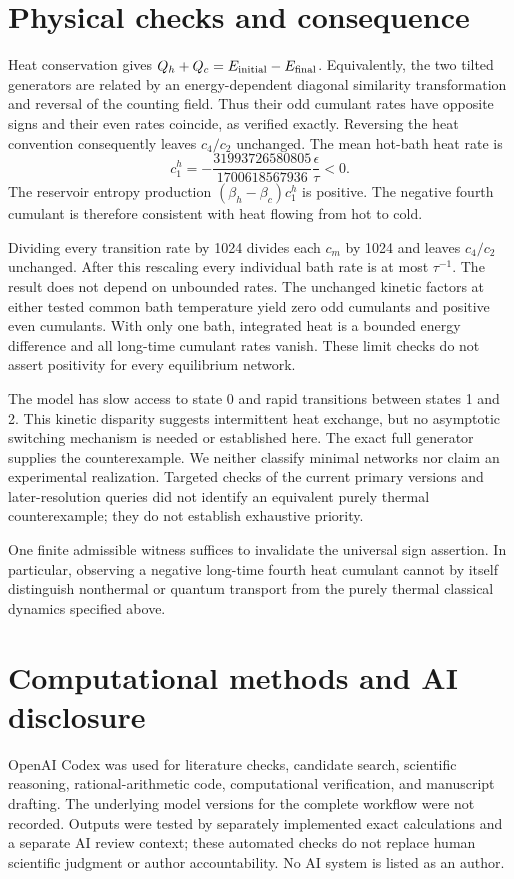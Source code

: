 \documentclass[aps,pre,10pt,onecolumn,notitlepage,longbibliography,amsmath,amssymb]{revtex4-2}
\begin{document}
\section{Physical checks and consequence}
Heat conservation gives $Q_h+Q_c=E_{\rm initial}-E_{\rm final}$. Equivalently, the two tilted generators are related by an energy-dependent diagonal similarity transformation and reversal of the counting field. Thus their odd cumulant rates have opposite signs and their even rates coincide, as verified exactly. Reversing the heat convention consequently leaves $c_4/c_2$ unchanged. The mean hot-bath heat rate is
\begin{equation}
 c_1^h=-\frac{31993726580805}{1700618567936}\frac{\epsilon}{\tau}<0.
\end{equation}
The reservoir entropy production $(\beta_h-\beta_c)c_1^h$ is positive. The negative fourth cumulant is therefore consistent with heat flowing from hot to cold.

Dividing every transition rate by 1024 divides each $c_m$ by 1024 and leaves $c_4/c_2$ unchanged. After this rescaling every individual bath rate is at most $\tau^{-1}$. The result does not depend on unbounded rates. The unchanged kinetic factors at either tested common bath temperature yield zero odd cumulants and positive even cumulants. With only one bath, integrated heat is a bounded energy difference and all long-time cumulant rates vanish. These limit checks do not assert positivity for every equilibrium network.

The model has slow access to state 0 and rapid transitions between states 1 and 2. This kinetic disparity suggests intermittent heat exchange, but no asymptotic switching mechanism is needed or established here. The exact full generator supplies the counterexample. We neither classify minimal networks nor claim an experimental realization. Targeted checks of the current primary versions and later-resolution queries did not identify an equivalent purely thermal counterexample; they do not establish exhaustive priority.

One finite admissible witness suffices to invalidate the universal sign assertion. In particular, observing a negative long-time fourth heat cumulant cannot by itself distinguish nonthermal or quantum transport from the purely thermal classical dynamics specified above.

\section*{Computational methods and AI disclosure}
OpenAI Codex was used for literature checks, candidate search, scientific reasoning, rational-arithmetic code, computational verification, and manuscript drafting. The underlying model versions for the complete workflow were not recorded. Outputs were tested by separately implemented exact calculations and a separate AI review context; these automated checks do not replace human scientific judgment or author accountability. No AI system is listed as an author.
\end{document}
